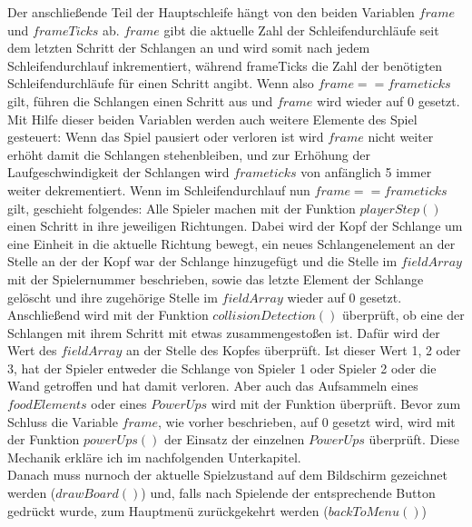 Der anschließende Teil der Hauptschleife hängt von den beiden Variablen $frame$ und $frameTicks$ ab. $frame$ gibt die aktuelle Zahl der Schleifendurchläufe seit dem letzten Schritt der Schlangen an und wird somit nach jedem Schleifendurchlauf inkrementiert, während frameTicks die Zahl der benötigten Schleifendurchläufe für einen Schritt angibt. Wenn also $frame == frameticks$ gilt, führen die Schlangen einen Schritt aus und $frame$ wird wieder auf 0 gesetzt. Mit Hilfe dieser beiden Variablen werden auch weitere Elemente des Spiel gesteuert: Wenn das Spiel pausiert oder verloren ist wird $frame$ nicht weiter erhöht damit die Schlangen stehenbleiben, und zur Erhöhung der Laufgeschwindigkeit der Schlangen wird $frameticks$ von anfänglich 5 immer weiter dekrementiert. Wenn im Schleifendurchlauf nun $frame == frameticks$ gilt, geschieht folgendes: Alle Spieler machen mit der Funktion $playerStep()$ einen Schritt in ihre jeweiligen Richtungen. Dabei wird der Kopf der Schlange um eine Einheit in die aktuelle Richtung bewegt, ein neues Schlangenelement an der Stelle an der der Kopf war der Schlange hinzugefügt und die Stelle im $fieldArray$ mit der Spielernummer beschrieben, sowie das letzte Element der Schlange gelöscht und ihre zugehörige Stelle im $fieldArray$ wieder auf 0 gesetzt. Anschließend wird mit der Funktion $collisionDetection()$ überprüft, ob eine der Schlangen mit ihrem Schritt mit etwas zusammengestoßen ist. Dafür wird der Wert des $fieldArray$ an der Stelle des Kopfes überprüft. Ist dieser Wert 1, 2 oder 3, hat der Spieler entweder die Schlange von Spieler 1 oder Spieler 2 oder die Wand getroffen und hat damit verloren. Aber auch das Aufsammeln eines $foodElements$ oder eines $PowerUps$ wird mit der Funktion überprüft. Bevor zum Schluss die Variable $frame$, wie vorher beschrieben, auf 0 gesetzt wird, wird mit der Funktion $powerUps()$ der Einsatz der einzelnen $PowerUps$ überprüft. Diese Mechanik erkläre ich im nachfolgenden Unterkapitel.\\
Danach muss nurnoch der aktuelle Spielzustand auf dem Bildschirm gezeichnet werden ($drawBoard()$) und, falls nach Spielende der entsprechende Button gedrückt wurde, zum Hauptmenü zurückgekehrt werden ($backToMenu()$)
%


